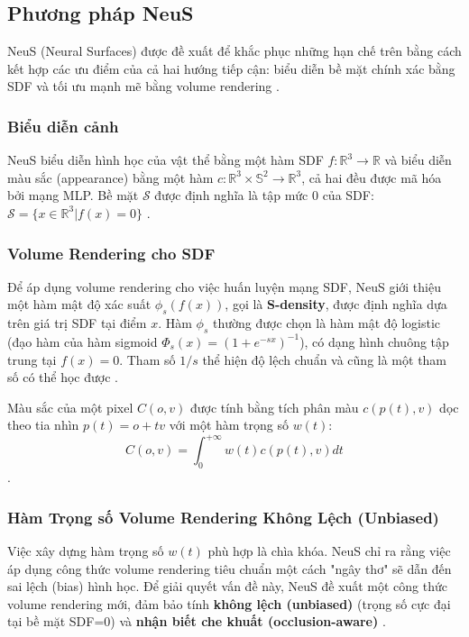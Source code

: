 \subsection{Phương pháp NeuS}

NeuS (Neural Surfaces) được đề xuất để khắc phục những hạn chế trên bằng cách kết hợp các ưu điểm của cả hai hướng tiếp cận: biểu diễn bề mặt chính xác bằng SDF và tối ưu mạnh mẽ bằng volume rendering \cite{Wang2021NeuS}. %

\subsubsection{Biểu diễn cảnh}
NeuS biểu diễn hình học của vật thể bằng một hàm SDF $f: \mathbb{R}^3 \to \mathbb{R}$ và biểu diễn màu sắc (appearance) bằng một hàm $c: \mathbb{R}^3 \times \mathbb{S}^2 \to \mathbb{R}^3$, cả hai đều được mã hóa bởi mạng MLP. Bề mặt $\mathcal{S}$ được định nghĩa là tập mức 0 của SDF: $\mathcal{S} = \{x \in \mathbb{R}^3 | f(x) = 0\}$ \cite{Wang2021NeuS}. %

\subsubsection{Volume Rendering cho SDF}
Để áp dụng volume rendering cho việc huấn luyện mạng SDF, NeuS giới thiệu một hàm mật độ xác suất $\phi_s(f(x))$, gọi là \textbf{S-density}, được định nghĩa dựa trên giá trị SDF tại điểm $x$. Hàm $\phi_s$ thường được chọn là hàm mật độ logistic (đạo hàm của hàm sigmoid $\Phi_s(x)=(1+e^{-sx})^{-1}$), có dạng hình chuông tập trung tại $f(x)=0$. Tham số $1/s$ thể hiện độ lệch chuẩn và cũng là một tham số có thể học được \cite{Wang2021NeuS}. %

Màu sắc của một pixel $C(o,v)$ được tính bằng tích phân màu $c(p(t), v)$ dọc theo tia nhìn $p(t) = o + tv$ với một hàm trọng số $w(t)$:
$$C(o,v) = \int_{0}^{+\infty} w(t) c(p(t), v) dt$$
\cite{Wang2021NeuS}. %

\subsubsection{Hàm Trọng số Volume Rendering Không Lệch (Unbiased)}
Việc xây dựng hàm trọng số $w(t)$ phù hợp là chìa khóa. NeuS chỉ ra rằng việc áp dụng công thức volume rendering tiêu chuẩn một cách "ngây thơ" sẽ dẫn đến sai lệch (bias) hình học. Để giải quyết vấn đề này, NeuS đề xuất một công thức volume rendering mới, đảm bảo tính \textbf{không lệch (unbiased)} (trọng số cực đại tại bề mặt SDF=0) và \textbf{nhận biết che khuất (occlusion-aware)} \cite{Wang2021NeuS}. %

